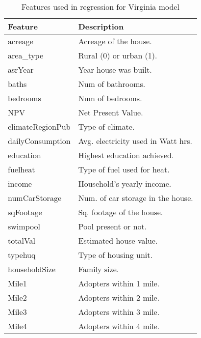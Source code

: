 \begin{table}[H]
	\centering
	\caption{Features used in regression for Virginia model}
	\begin{tabular}{|l|p{5cm}|}
		\hline
		{\bf Feature} & {\bf Description} \\ 
		\hline
		acreage & Acreage of the house. \\ 
		\hline
		area\_type & Rural (0) or urban (1). \\ 
		\hline
		asrYear & Year house was built.  \\ 
		\hline
		baths & Num of bathrooms. \\ 
		\hline
		bedrooms & Num of bedrooms. \\ 
		\hline
		NPV & Net Present Value. \\ 
		\hline
		climateRegionPub & Type of climate. \\ 
		\hline
		dailyConsumption & Avg. electricity used in Watt
                                   hrs. \\ 
		\hline
		education & Highest education achieved. \\ 
		\hline
	    fuelheat & Type of fuel used for heat. \\ 
	    \hline
		income & Household's yearly income.  \\ 
		\hline
		numCarStorage & Num. of car storage in the house. \\
		\hline 
		sqFootage & Sq. footage of the house.  \\ 
		\hline
		swimpool & Pool present or not. \\ 
		\hline
		totalVal & Estimated house value. \\
		\hline 
		typehuq & Type of housing unit. \\ 
		\hline
		householdSize & Family size. \\ 
		\hline
		Mile1 & Adopters within 1 mile. \\ 
		Mile2 & Adopters within 2 mile. \\ 
		Mile3 & Adopters within 3 mile. \\ 
		Mile4 & Adopters within 4 mile. \\
		\hline
	\end{tabular}
	\label{tab: feature description}
\end{table}
